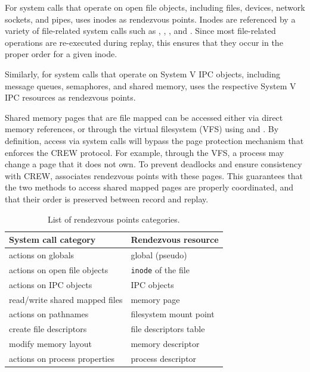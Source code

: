   

For system calls that operate on open file objects, including files,
devices, network sockets, and pipes, \scribe{} uses inodes as
rendezvous points.  Inodes are referenced by a variety of file-related
system calls such as , ,
,
and .  Since most
file-related operations are re-executed during replay, this ensures
that they occur in the proper order for a given inode.
 
Similarly, for system calls that operate on System V IPC
objects, including message queues, semaphores, and shared memory,
\scribe{} uses the respective System V IPC resources as rendezvous points.

Shared memory pages that are file mapped can be accessed either via
direct memory references, or through the virtual filesystem (VFS)
using  and . By definition, access via
system calls will bypass the page protection mechanism that enforces
the CREW protocol. For example, through the VFS, a process may change a
page that it does not own. To prevent deadlocks and ensure consistency
with CREW, \scribe{} associates rendezvous points with these pages.
This guarantees that the two methods to access shared mapped pages are
properly coordinated, and that their order is preserved between record
and replay.

\begin{table}[]
\begin{center}
\begin{tabular}{|l|l|}
  \hline
  {\bf System call category}     & {\bf Rendezvous resource} \\ \hline
  actions on globals             & global (pseudo)           \\ \hline
  actions on open file objects   & {\tt inode} of the file   \\ \hline
  actions on IPC objects         & IPC objects               \\ \hline
  read/write shared mapped files & memory page               \\ \hline
  actions on pathnames           & filesystem mount point    \\ \hline
  create file descriptors        & file descriptors table    \\ \hline
  modify memory layout           & memory descriptor         \\ \hline
  actions on process properties  & process descriptor        \\ \hline
\end{tabular}
\end{center}
\vspace{-1em}
\caption{List of rendezvous points categories.}
\label{scribe:tab:rendezvous}
\end{table}

